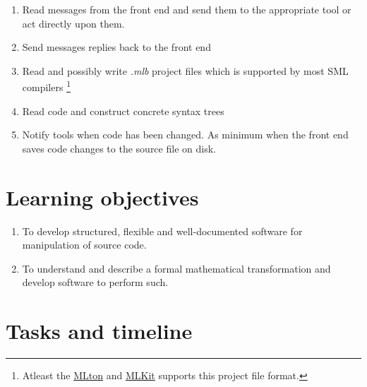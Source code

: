 \documentclass[a4paper,oneside]{memoir}
\begin{document}
\begin{enumerate}
\item Read messages from the front end and send them to the appropriate tool or
  act directly upon them.
  
\item Send messages replies back to the front end

\item Read and possibly write \textit{.mlb} project files which is supported by
  most SML compilers \footnote{Atleast the \href{http://mlton.org/}{MLton} and
    \href{http://www.itu.dk/research/mlkit}{MLKit} supports this project file
    format.}

\item Read code and construct concrete syntax trees

\item Notify tools when code has been changed. As minimum when the front end
  saves code changes to the source file on disk.
\end{enumerate}



\section{Learning objectives}

\begin{enumerate}
\item To develop structured, flexible and well-documented software for
  manipulation of source code.
\item To understand and describe a formal mathematical transformation
  and develop software to perform such.
\end{enumerate}

\section{Tasks and timeline}
\end{document}
